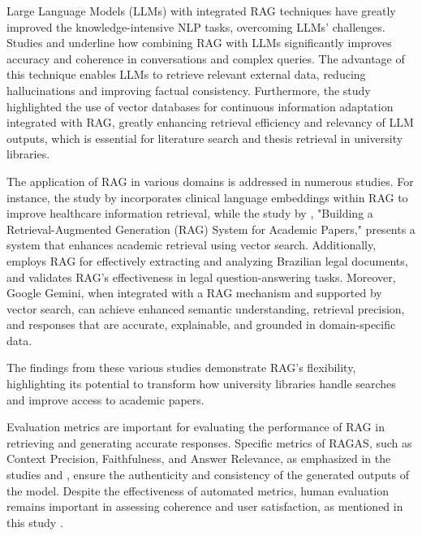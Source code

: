 \begin{refsection}
\hspace{0.4cm}Large Language Models (LLMs) with integrated RAG techniques have greatly improved the knowledge-intensive NLP tasks, overcoming LLMs' challenges. Studies \cite{thapa2022splitfed} and \cite{thomo2024pubmed} underline how combining RAG with LLMs significantly improves accuracy and coherence in conversations and complex queries. The advantage of this technique enables LLMs to retrieve relevant external data, reducing hallucinations and improving factual consistency. Furthermore, the study \cite{lewis2020retrieval} highlighted the use of vector databases for continuous information adaptation integrated with RAG, greatly enhancing retrieval efficiency and relevancy of LLM outputs, which is essential for literature search and thesis retrieval in university libraries.


\hspace{0.4cm}The application of RAG in various domains is addressed in numerous studies. For instance, the study by \citeauthor{arzideh2024miracle} \citeyear{arzideh2024miracle} incorporates clinical language embeddings within RAG to improve healthcare information retrieval, while the study by \citeauthor{grigoryan2024building} \citeyear{grigoryan2024building}, "Building a Retrieval-Augmented Generation (RAG) System for Academic Papers," presents a system that enhances academic retrieval using vector search. Additionally, \citeauthor{aquino2024extracting} \citeyear{aquino2024extracting} employs RAG for effectively extracting and analyzing Brazilian legal documents, and \citeauthor{ryu2023retrieval} \citeyear{ryu2023retrieval} validates RAG’s effectiveness in legal question-answering tasks. Moreover, Google Gemini, when integrated with a RAG mechanism and supported by vector search, can achieve enhanced semantic understanding, retrieval precision, and responses that are accurate, explainable, and grounded in domain-specific data.


The findings from these various studies demonstrate RAG's flexibility, highlighting its potential to transform how university libraries handle searches and improve access to academic papers.

\hspace{0.4cm}Evaluation metrics are important for evaluating the performance of RAG in retrieving and generating accurate responses. Specific metrics of RAGAS, such as Context Precision, Faithfulness, and Answer Relevance, as emphasized in the studies \cite{sagi2024genai} and \cite{arzideh2024miracle}, ensure the authenticity and consistency of the generated outputs of the model. Despite the effectiveness of automated metrics, human evaluation remains important in assessing coherence and user satisfaction, as mentioned in this study \cite{aquino2024extracting}.


\end{refsection}
